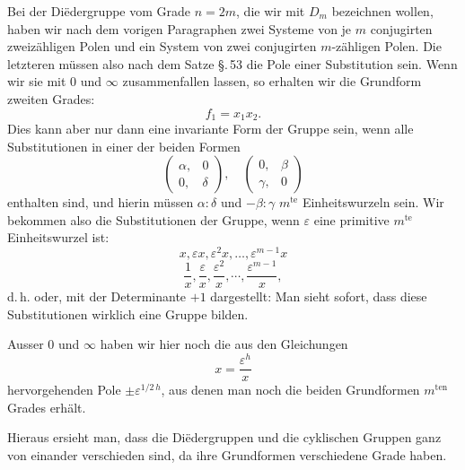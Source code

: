 Bei der Di\"edergruppe vom Grade $n = 2m$, die wir mit $D_m$
bezeichnen wollen, haben wir nach dem vorigen Paragraphen
zwei Systeme von je $m$ conjugirten zweizähligen Polen und ein
System von zwei conjugirten $m$-zähligen Polen. Die letzteren
müssen also nach dem Satze \S.\,53 die Pole einer Substitution
sein. Wenn wir sie mit $0$ und $\infty$ zusammenfallen lassen, so erhalten
 wir die Grundform zweiten Grades:
\[
f_1 = x_1 x_2.
\]
Dies kann aber nur dann eine invariante Form der Gruppe
sein, wenn alle Substitutionen in einer der beiden Formen
\[
\begin{pmatrix} \alpha, & 0 \\ 0, & \delta \end{pmatrix}, \quad \begin{pmatrix} 0, & \beta \\ \gamma, & 0 \end{pmatrix}
\]
enthalten sind, und hierin müssen $\alpha:\delta$ und $-\beta:\gamma$ $m^{\text{te}}$ Einheitswurzeln
 sein. Wir bekommen also die Substitutionen der Gruppe,
wenn $\varepsilon$ eine primitive $m^{\text{te}}$ Einheitswurzel ist:
\[
x, \varepsilon x, \varepsilon^2 x, \ldots, \varepsilon^{m-1} x
\]
\[
\frac{1}{x}, \frac{\varepsilon}{x}, \frac{\varepsilon^2}{x}, \cdots, \frac{\varepsilon^{m-1}}{x},
\]
d.\,h.
oder, mit der Determinante $+1$ dargestellt:
Man sieht sofort, dass diese Substitutionen wirklich eine
Gruppe bilden.

Ausser $0$ und $\infty$ haben wir hier noch die aus den Gleichungen
\[
x = \frac{\varepsilon^h}{x}
\]
hervorgehenden Pole $\pm \varepsilon^{1/2\,h}$, aus denen man noch die beiden
Grundformen $m^{\text{ten}}$ Grades
erhält.

Hieraus ersieht man, dass die Di\"edergruppen und die cyklischen
 Gruppen ganz von einander verschieden sind, da ihre
Grundformen verschiedene Grade haben.
